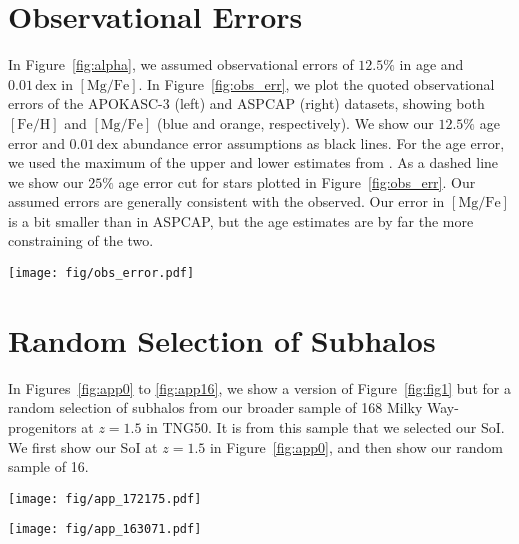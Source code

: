 \documentclass[twocolumn]{aastex631}
\newcommand{\FeH}{\ensuremath{[\textrm{Fe}/\textrm{H}]}}
\newcommand{\MgFe}{\ensuremath{[\textrm{Mg}/\textrm{Fe}]}}
\newcommand{\dex}{\ensuremath{\textrm{dex}}}
\begin{document}
\section{Observational Errors}\label{app:obs_err}
In Figure~\ref{fig:alpha}, we assumed observational errors of $12.5\%$ in age and $0.01\,\dex$ in \MgFe{}. In Figure~\ref{fig:obs_err}, we plot the quoted observational errors of the APOKASC-3 (left) and ASPCAP (right) datasets, showing both \FeH{} and \MgFe{} (blue and orange, respectively). We show our $12.5\%$ age error and $0.01\,\dex$ abundance error assumptions as black lines. For the age error, we used the maximum of the upper and lower estimates from \citet{2018ApJS..239...32P}. As a dashed line we show our $25\%$ age error cut for stars plotted in Figure~\ref{fig:obs_err}. Our assumed errors are generally consistent with the observed. Our error in \MgFe{} is a bit smaller than in ASPCAP, but the age estimates are by far the more constraining of the two.

\begin{figure*}
  \centering
  \texttt{[image: fig/obs\_error.pdf]}
  \caption{The observational errors of the APOKASC-3 (left) and ASPCAP dataset (right). We show, on the left, a line indicating a $12.5\%$ error in observed age and on the right a vertical line indicating a $0.01\,\dex$ error. On the left, a dashed line indicates the $25\%$ error cut used for inclusion in Figure~\ref{fig:alpha}.}
  \label{fig:obs_err}
\end{figure*}

\section{Random Selection of Subhalos}\label{app:rand_fig1}
In Figures~\ref{fig:app0} to \ref{fig:app16}, we show a version of Figure~\ref{fig:fig1} but for a random selection of subhalos from our broader sample of 168 Milky Way-progenitors at $z=1.5$ in TNG50. It is from this sample that we selected our SoI. We first show our SoI at $z=1.5$ in Figure~\ref{fig:app0}, and then show our random sample of 16.

\begin{figure*}
  \centering
  \texttt{[image: fig/app\_172175.pdf]}
  \caption{The same as Figure~\ref{fig:fig1}, but for our SoI at $z=1.5$.}
  \label{fig:app0}
\end{figure*}

\begin{figure*}
  \centering
  \texttt{[image: fig/app\_163071.pdf]}
  \caption{The same as Figure~\ref{fig:fig1}, but for a random subhalo from our catalog at $z=1.5$.}
  \label{fig:app1}
\end{figure*}
\end{document}
